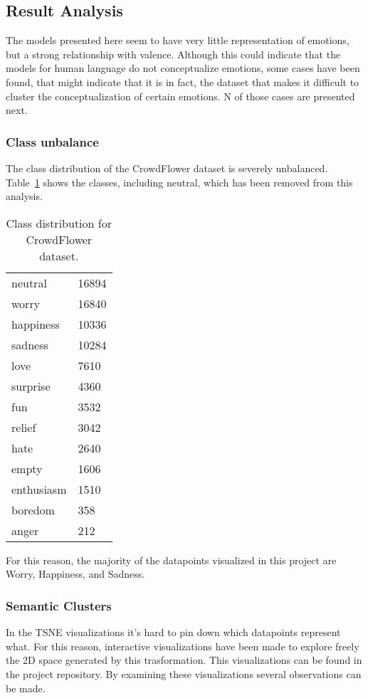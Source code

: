 \subsection{Result Analysis}\label{sub:Result Analysis}
The models presented here seem to have very little representation of emotions, but a strong relationship with valence. Although this could indicate that the models for human language do not conceptualize emotions, some cases have been found, that might indicate that it is in fact, the dataset that makes it difficult to cluster the conceptualization of certain emotions.
N of those cases are presented next.

\subsubsection{Class unbalance}
The class distribution of the CrowdFlower dataset is severely unbalanced. Table~\ref{tab:CrowdFlower_distribution} shows the classes, including neutral, which has been removed from this analysis.

\begin{table}
    \centering
    \begin{tabular}{|l|l|}
    \hline
      neutral     &  16894 \\
      worry       &  16840 \\
      happiness   &  10336 \\
      sadness     &  10284 \\
      love        &   7610 \\
      surprise    &   4360 \\
      fun         &   3532 \\
      relief      &   3042 \\
      hate        &   2640 \\
      empty       &   1606 \\
      enthusiasm  &   1510 \\
      boredom     &    358 \\
      anger       &    212 \\
    \end{tabular}
    \caption{Class distribution for CrowdFlower dataset.}\label{tab:CrowdFlower_distribution}
\end{table}

For this reason, the majority of the datapoints visualized in this project are Worry, Happiness, and Sadness.

\subsubsection{Semantic Clusters}
In the TSNE visualizations it's hard to pin down which datapoints represent what. For this reason, interactive visualizations have been made to explore freely the 2D space generated by this trasformation. This visualizations can be found in the project repository. By examining these visualizations several observations can be made.


